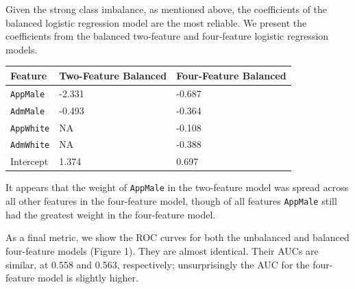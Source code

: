 \documentclass{article}
\begin{document}
Given the strong class imbalance, as mentioned above, the coefficients of the balanced logistic regression model are the most reliable. We present the coefficients from the balanced two-feature and four-feature logistic regression models.

\begin{tabular}{lll}
\toprule
Feature &   Two-Feature Balanced &   Four-Feature Balanced\\
\midrule
\texttt{AppMale} & -2.331 & -0.687  \\
\texttt{AdmMale} & -0.493 & -0.364 \\
\texttt{AppWhite} & NA & -0.108 \\
\texttt{AdmWhite} & NA & -0.388 \\
Intercept & 1.374 & 0.697 \\
\bottomrule
\end{tabular}

It appears that the weight of \texttt{AppMale} in the two-feature model was spread across all other features in the four-feature model, though of all features \texttt{AppMale} still had the greatest weight in the four-feature model.

As a final metric, we show the ROC curves for both the unbalanced and balanced four-feature models (Figure 1). They are almost identical. Their AUCs are similar, at 0.558 and 0.563, respectively; unsurprisingly the AUC for the four-feature model is slightly higher.

\end{document}
